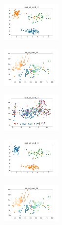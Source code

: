 \begin{figure}[H]
\begin{subfigure}
    \end{subfigure}
    \hfill
    \begin{subfigure}
        \centering
        \includegraphics[width=0.32\textwidth]{img/bl/rand_set_const_20_589741062_clust.png}
    \end{subfigure}
    \hfill
    \begin{subfigure}
        \centering
        \includegraphics[width=0.32\textwidth]{img/bl/iris_set_const_20_277451237_clust.png}
    \end{subfigure}
    \hfill
    \begin{subfigure}
        \centering
        \includegraphics[width=0.32\textwidth]{img/bl/ecoli_set_const_20_277451237_clust.png}
    \end{subfigure}
    \hfill
    \begin{subfigure}
        \centering
        \includegraphics[width=0.32\textwidth]{img/bl/rand_set_const_20_277451237_clust.png}
    \end{subfigure}
    \hfill
    \begin{subfigure}
        \centering
        \includegraphics[width=0.32\textwidth]{img/bl/iris_set_const_20_49258669_clust.png}

\end{subfigure}
\end{figure}
